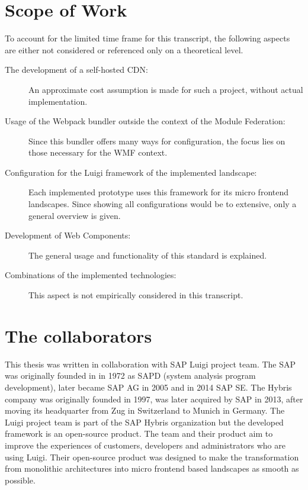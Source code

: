 \section{Scope of Work}

To account for the limited time frame for this transcript, the following aspects are either not considered or referenced only on a theoretical level.

\begin{description}
	\item[The development of a self-hosted CDN:] An approximate cost assumption is made for such a project, without actual implementation.
	\item[Usage of the Webpack bundler outside the context of the Module Federation:] Since this bundler offers many ways for configuration, the focus lies on those necessary for the WMF context. 
	\item[Configuration for the Luigi framework of the implemented landscape:] Each implemented prototype uses this framework for its micro frontend landscapes. Since showing all configurations would be to extensive, only a general overview is given. 
	\item[Development of Web Components:] The general usage and functionality of this standard is explained. 
	\item[Combinations of the implemented technologies:] This aspect is not empirically considered in this transcript. 
\end{description}

\section{The collaborators}

This thesis was written in collaboration with SAP Luigi project team. The SAP was originally founded in in 1972 as SAPD (system analysis program development), later became SAP AG in 2005 and in 2014 SAP SE. The Hybris company was originally founded in 1997, was later acquired by SAP in 2013, after moving its headquarter from Zug in Switzerland to Munich in Germany.\cite{sap_history} The Luigi project team is part of the SAP Hybris organization but the developed framework is an open-source product. 
The team and their product aim to improve the experiences of customers, developers and administrators who are using Luigi. Their open-source product was designed to make the transformation from monolithic architectures into micro frontend based landscapes as smooth as possible. 

 
